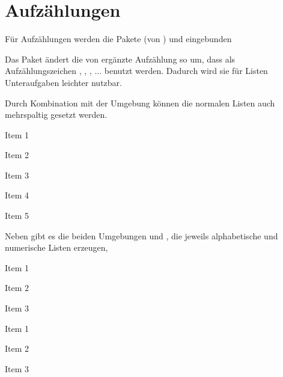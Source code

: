 \section{Aufzählungen}\label{sec:aufzaehlungen}
Für Aufzählungen werden die Pakete  (von ) und  eingebunden

Das Paket ändert die von  ergänzte Aufzählung  so um, dass als Aufzählungszeichen , , , ... benutzt werden. Dadurch wird sie für Listen Unteraufgaben leichter nutzbar.

Durch Kombination mit der Umgebung  können die normalen Listen auch mehrspaltig gesetzt werden.

\begin{example}
	\begin{multicols}{3}
		\begin{smallenumerate}
			\item Item 1
			\item Item 2
			\item Item 3
			\item Item 4
			\item Item 5
		\end{smallenumerate}
	\end{multicols}
\end{example}

Neben  gibt es die beiden Umgebungen  und , die jeweils alphabetische und numerische Listen erzeugen,

\begin{example}
	\begin{multicols}{3}
		\begin{enumeratea}
			\item Item 1
			\item Item 2
			\item Item 3
		\end{enumeratea}
	\end{multicols}
\end{example}


\begin{example}
	\begin{multicols}{4}
		\begin{enumeraten}
			\item Item 1
			\item Item 2
			\item Item 3
		\end{enumeraten}
	\end{multicols}
\end{example}

